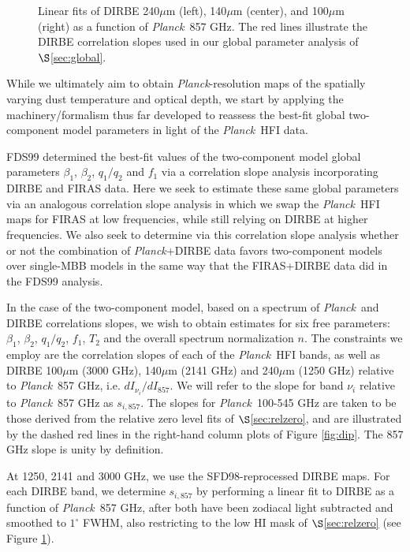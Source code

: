 \documentclass{emulateapj}
\newcommand{\PLANCK}{{\it Planck}}
\begin{document}
\begin{figure*}
\begin{center}
\caption{\label{fig:dirbe_slopes} Linear fits of DIRBE 240$\mu$m (left), 
140$\mu$m (center), and 100$\mu$m (right) as a function of \PLANCK~857 GHz. The
red lines illustrate the DIRBE correlation slopes used in our global parameter 
analysis of $\S$\ref{sec:global}.}
\end{center}
\end{figure*}

While we ultimately aim to obtain \PLANCK-resolution maps of the spatially 
varying dust temperature and optical depth, we start by applying the 
machinery/formalism thus far developed to reassess the best-fit global 
two-component model parameters in light of the \PLANCK~HFI data.

FDS99 determined the best-fit values of the two-component model global 
parameters $\beta_1$, $\beta_2$, $q_1/q_2$ and $f_1$ via a correlation slope
analysis incorporating DIRBE and FIRAS data. Here we seek to estimate these 
same global parameters via an analogous correlation slope analysis in which we 
swap the \PLANCK~HFI maps for FIRAS at low frequencies, while still relying on 
DIRBE at higher frequencies. We also seek to determine via this correlation 
slope analysis whether or not the combination of \PLANCK+DIRBE data favors 
two-component models over single-MBB models in the same way that the 
FIRAS+DIRBE data did in the FDS99 analysis.

In the case of the two-component model, based on a spectrum of \PLANCK~and 
DIRBE correlations slopes, we wish to obtain estimates for six free parameters:
$\beta_1$, $\beta_2$, $q_1/q_2$, $f_1$, $T_2$ and the overall spectrum 
normalization $n$. The constraints we employ are the correlation slopes of each
of the \PLANCK~HFI bands, as well as DIRBE 100$\mu$m (3000 GHz), 140$\mu$m 
(2141 GHz) and 240$\mu$m (1250 GHz) relative to \PLANCK~857 GHz, i.e. 
$dI_{\nu_i}/dI_{857}$. We will refer to the slope for band $\nu_i$ relative to 
\PLANCK~857 GHz as $s_{i,857}$. The slopes for \PLANCK~100-545 GHz are taken 
to be those derived from the relative zero level fits of $\S$\ref{sec:relzero},
and are illustrated by the dashed red lines in the right-hand column plots of 
Figure \ref{fig:dip}. The 857 GHz slope is unity by definition.

At 1250, 2141 and 3000 GHz, we use the SFD98-reprocessed DIRBE maps. For each
DIRBE band, we determine $s_{i, 857}$ by performing a linear fit to DIRBE as a 
function of \PLANCK~857 GHz, after both have been zodiacal light subtracted and
smoothed to $1^{\circ}$ FWHM, also restricting to the low HI mask of 
$\S$\ref{sec:relzero} (see Figure \ref{fig:dirbe_slopes}).
\end{document}
